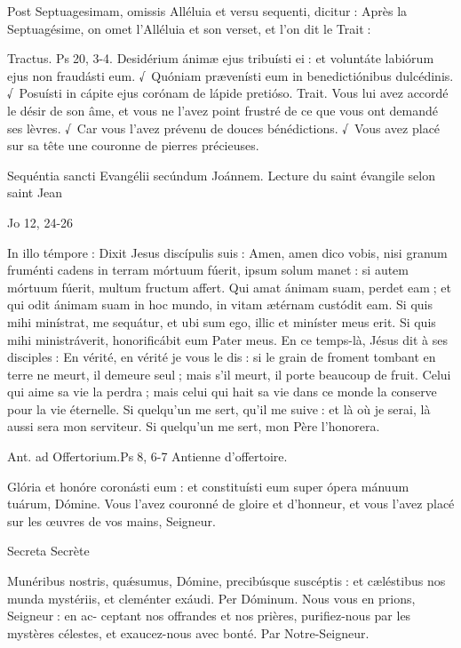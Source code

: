 \begin{paracol}{2}
Post Septuagesimam, omissis Alléluia et versu sequenti, dicitur :
\switchcolumn
Après la Septuagésime, on omet l’Alléluia et son verset, et l’on dit le Trait :
\switchcolumn*

Tractus. Ps 20, 3-4. Desidérium ánimæ ejus tribuísti ei : et voluntáte labiórum ejus non fraudásti eum. √~Quóniam prævenísti eum in benedictiónibus dulcédinis. √~Posuísti in cápite ejus corónam de lápide pretióso.
\switchcolumn
Trait. Vous lui avez accordé le désir de son âme, et vous ne l’avez point frustré de ce que vous ont demandé ses lèvres. √~Car vous l’avez prévenu de douces bénédictions. √~Vous avez placé sur sa tête une couronne de pierres précieuses.
\switchcolumn*

Sequéntia sancti Evangélii secúndum Joánnem.
\switchcolumn
Lecture du saint évangile selon saint Jean
\switchcolumn*

Jo 12, 24-26
\switchcolumn

\switchcolumn*

In illo témpore : Dixit Jesus discípulis  suis : Amen, amen dico vobis, nisi granum fruménti cadens in terram mórtuum fúerit, ipsum solum manet : si autem mórtuum fúerit, multum fructum affert. Qui amat ánimam suam, perdet eam ; et qui odit ánimam suam in hoc mundo, in vitam ætérnam custódit eam. Si quis mihi minístrat, me sequátur, et ubi sum ego, illic et miníster meus erit. Si quis mihi ministráverit, honorificábit eum Pater meus.
\switchcolumn
En ce temps-là, Jésus dit à ses disciples :  En vérité, en vérité je vous le dis : si le grain de froment tombant en terre ne meurt, il demeure seul ; mais s’il meurt, il porte beaucoup de fruit. Celui qui aime sa vie la perdra ; mais celui qui hait sa vie dans ce monde la conserve pour la vie éternelle. Si quelqu’un me sert, qu’il me suive : et là où je serai, là aussi sera mon serviteur. Si quelqu’un me sert, mon Père l’honorera.
\switchcolumn*

Ant. ad Offertorium.\hfill Ps 8, 6-7
\switchcolumn
Antienne d’offertoire.
\switchcolumn*

Glória et honóre coronásti eum : et constituísti eum super ópera mánuum tuárum, Dómine.
\switchcolumn
Vous l’avez couronné de gloire et d’honneur, et vous l’avez placé sur les œuvres de vos mains, Seigneur.
\switchcolumn*

Secreta
\switchcolumn
Secrète
\switchcolumn*

Munéribus nostris, quǽsumus,  Dómine, precibúsque suscéptis : et cæléstibus nos munda mystériis, et cleménter exáudi. Per Dóminum.
\switchcolumn
Nous vous en prions, Seigneur : en ac- ceptant nos offrandes et nos prières, purifiez-nous par les mystères célestes, et exaucez-nous avec bonté. Par Notre-Seigneur.
\switchcolumn*


\end{paracol}
